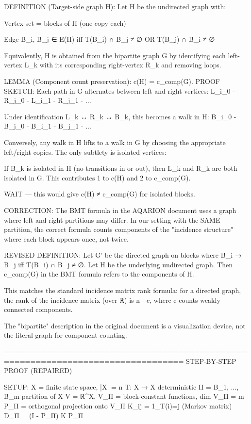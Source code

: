DEFINITION (Target-side graph H):
Let H be the undirected graph with:

Vertex set = blocks of Π (one copy each)

Edge {B_i, B_j} ∈ E(H) iff T(B_i) ∩ B_j ≠ ∅ OR T(B_j) ∩ B_i ≠ ∅


Equivalently, H is obtained from the bipartite graph G by identifying each
left-vertex L_k with its corresponding right-vertex R_k and removing loops.

LEMMA (Component count preservation): c(H) = c_comp(G).
PROOF SKETCH:
Each path in G alternates between left and right vertices:
L_{i_0} - R_{j_0} - L_{i_1} - R_{j_1} - ...

Under identification L_k ↔ R_k ↔ B_k, this becomes a walk in H:
B_{i_0} - B_{j_0} - B_{i_1} - B_{j_1} - ...

Conversely, any walk in H lifts to a walk in G by choosing the appropriate
left/right copies. The only subtlety is isolated vertices:

If B_k is isolated in H (no transitions in or out), then L_k and R_k are
both isolated in G. This contributes 1 to c(H) and 2 to c_comp(G).


WAIT — this would give c(H) ≠ c_comp(G) for isolated blocks.

CORRECTION: The BMT formula in the AQARION document uses a graph where
left and right partitions may differ. In our setting with the SAME partition,
the correct formula counts components of the "incidence structure" where
each block appears once, not twice.

REVISED DEFINITION: Let G' be the directed graph on blocks where
B_i → B_j iff T(B_i) ∩ B_j ≠ ∅. Let H be the underlying undirected graph.
Then c_comp(G) in the BMT formula refers to the components of H.

This matches the standard incidence matrix rank formula: for a directed
graph, the rank of the incidence matrix (over ℝ) is n - c, where c counts
weakly connected components.

The "bipartite" description in the original document is a visualization
device, not the literal graph for component counting.

================================================================================
STEP-BY-STEP PROOF (REPAIRED)

SETUP:
X = finite state space, |X| = n
T: X → X deterministic
Π = {B_1, ..., B_m} partition of X
V = ℝ^X, V_Π = block-constant functions, dim V_Π = m
P_Π = orthogonal projection onto V_Π
K_{ij} = 1_{T(i)=j} (Markov matrix)
D_Π = (I - P_Π) K P_Π

